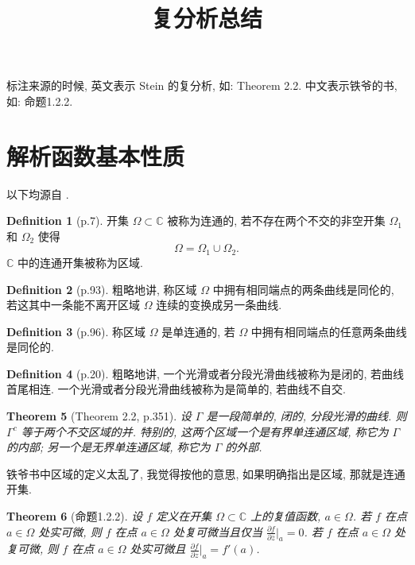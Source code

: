 \documentclass[a4paper,11pt]{article}
\title{复分析总结}
\newtheorem{theorem}{Theorem}[section]
\theoremstyle{definition}
\newtheorem{definition}[theorem]{Definition}
\begin{document}
\maketitle

标注来源的时候, 英文表示 Stein 的复分析, 如: Theorem 2.2. 中文表示铁爷的书, 如: 命题1.2.2.

\section{解析函数基本性质}

以下均源自 \cite{ss10}.

\begin{definition}[p.7]
    开集 $ \Omega \subset \mathbb{C} $ 被称为连通的, 若不存在两个不交的非空开集 $ \Omega_1 $ 和 $ \Omega_2 $ 使得
    $$
        \Omega = \Omega_1 \cup \Omega_2.
    $$
    $ \mathbb{C} $ 中的连通开集被称为区域.
\end{definition}

\begin{definition}[p.93]
    粗略地讲, 
    称区域 $ \Omega $ 中拥有相同端点的两条曲线是同伦的, 若这其中一条能不离开区域 $ \Omega $ 连续的变换成另一条曲线.
\end{definition}

\begin{definition}[p.96]
    称区域 $ \Omega $ 是单连通的, 若 $ \Omega $ 中拥有相同端点的任意两条曲线是同伦的.
\end{definition}


\begin{definition}[p.20]
    粗略地讲, 
    一个光滑或者分段光滑曲线被称为是闭的, 若曲线首尾相连.    
    一个光滑或者分段光滑曲线被称为是简单的, 若曲线不自交.
\end{definition}

\begin{theorem}[Theorem 2.2, p.351]
    设 $ \Gamma $ 是一段简单的, 闭的, 分段光滑的曲线. 则 $ \Gamma^c $ 等于两个不交区域的并. 
    特别的, 这两个区域一个是有界单连通区域, 称它为 $ \Gamma $ 的内部;
    另一个是无界单连通区域, 称它为 $ \Gamma $ 的外部.
\end{theorem}

铁爷书中区域的定义太乱了, 我觉得按他的意思, 如果明确指出是区域, 那就是连通开集.

\begin{theorem}[命题1.2.2]
    设 $ f $ 定义在开集 $ \Omega \subset \mathbb{C} $ 上的复值函数, $ a \in \Omega $. 
    若 $ f $ 在点 $ a \in \Omega $ 处实可微, 
    则 $ f $ 在点 $ a \in \Omega $ 处复可微当且仅当 $ \frac{\partial f}{\partial \overline{z}}|_a = 0 $.
    若 $ f $ 在点 $ a \in \Omega $ 处复可微, 
    则 $ f $ 在点 $ a \in \Omega $ 处实可微且 $ \frac{\partial f}{\partial z}|_a = f'(a) $.
\end{theorem}
\end{document}
